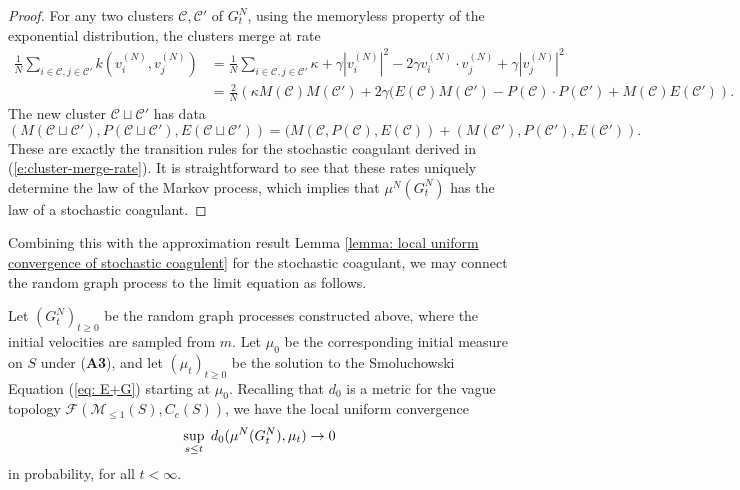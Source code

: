 \begin{proof} For any two clusters $\mathcal{C}, \mathcal{C}'$ of $G^N_t$, using the memoryless property of the exponential distribution, the clusters merge at rate \begin{equation} \begin{split}
    \frac{1}{N}\sum_{i \in \mathcal{C}, j \in \mathcal{C}'} k(v^{(N)}_i, v^{(N)}_j)& = \frac{1}{N}\sum_{i\in \mathcal{C}, j \in \mathcal{C}'} \kappa+\gamma|v^{(N)}_i|^2-2\gamma v^{(N)}_i \cdot v^{(N)}_j + \gamma|v^{(N)}_j|^2 \\ &= \frac{2}{N}\left(\kappa M(\mathcal{C})M(\mathcal{C}') +2\gamma (E(\mathcal{C})M(\mathcal{C}')-P(\mathcal{C})\cdot P(\mathcal{C}')+M(\mathcal{C}) E(\mathcal{C}')\right).
\end{split} \end{equation} The new cluster $\mathcal{C}\sqcup \mathcal{C}'$ has data \begin{equation}
    (M(\mathcal{C}\sqcup \mathcal{C}'), P(\mathcal{C}\sqcup \mathcal{C}'),E(\mathcal{C}\sqcup \mathcal{C}'))=(M(\mathcal{C},P(\mathcal{C}), E(\mathcal{C}))+(M(\mathcal{C}'),P(\mathcal{C}'), E(\mathcal{C}')).
\end{equation}These are exactly the transition rules for the stochastic coagulant derived in (\ref{e:cluster-merge-rate}). It is straightforward to see that these rates uniquely determine the law of the Markov process, which implies that $\mu^N(G^N_t)$ has the law of a stochastic coagulant. \end{proof} Combining this with the approximation result Lemma \ref{lemma: local uniform convergence of stochastic coagulent} for the stochastic coagulant, we may connect the random graph process to the limit equation as follows. \begin{lemma}\label{lemma: convergence of random graphs} Let $(G^N_t)_{t\ge 0}$ be the random graph processes constructed above, where the initial velocities are sampled from $m$. Let $\mu_0$ be the corresponding initial measure on $S$ under (\textbf{A3}), and let $(\mu_t)_{t\ge 0}$ be the solution to the Smoluchowski Equation (\ref{eq: E+G}) starting at $\mu_0$. Recalling that $d_0$ is a metric for the vague topology $\mathcal{F}(\mathcal{M}_{\le 1}(S), C_c(S))$, we have the local uniform convergence \begin{equation}\sup_{s\le t} \hspace{0.1cm}d_0(\mu^N(G^N_t), \mu_t) \rightarrow 0 \end{equation} in probability, for all $t<\infty.$ \end{lemma} 

